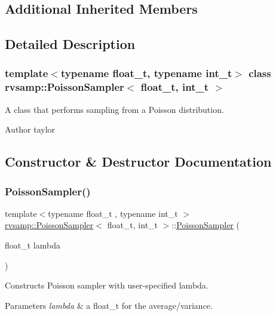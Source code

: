\subsection*{Additional Inherited Members}


\subsection{Detailed Description}
\subsubsection*{template$<$typename float\+\_\+t, typename int\+\_\+t$>$\newline
class rvsamp\+::\+Poisson\+Sampler$<$ float\+\_\+t, int\+\_\+t $>$}

A class that performs sampling from a Poisson distribution. 

\begin{DoxyAuthor}{Author}
taylor 
\end{DoxyAuthor}


\subsection{Constructor \& Destructor Documentation}
\mbox{\label{classrvsamp_1_1PoissonSampler_ac0a7d1c44968588326518e73b6ce11e3}} 
\subsubsection{\texorpdfstring{Poisson\+Sampler()}{PoissonSampler()}}
{\footnotesize\ttfamily template$<$typename float\+\_\+t , typename int\+\_\+t $>$ \\
\hyperlink{classrvsamp_1_1PoissonSampler}{rvsamp\+::\+Poisson\+Sampler}$<$ float\+\_\+t, int\+\_\+t $>$\+::\hyperlink{classrvsamp_1_1PoissonSampler}{Poisson\+Sampler} (\begin{DoxyParamCaption}\item[{float\+\_\+t}]{lambda }\end{DoxyParamCaption})}



Constructs Poisson sampler with user-\/specified lambda. 


\begin{DoxyParams}{Parameters}
{\em lambda} & a float\+\_\+t for the average/variance. \\
\hline
\end{DoxyParams}


